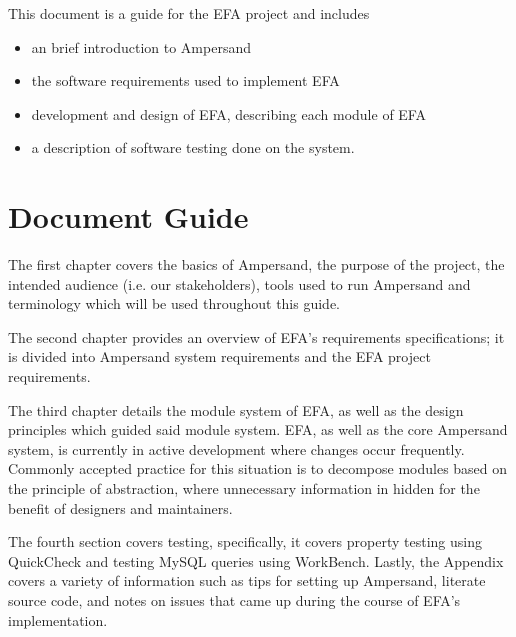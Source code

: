 \documentclass[journal,12pt,onecolumn,draftclsnofoot]{report}
\begin{document}
This document is a guide for the EFA project and includes 

\begin{itemize}
\item an brief introduction 
to Ampersand
\item the software requirements used to implement EFA
\item development and design of EFA, describing each module of EFA
\item a description of software testing done on the system.
\end{itemize}

\section{Document Guide}

The first chapter covers 
the basics of Ampersand, the purpose of the project, the intended audience 
(i.e. our stakeholders), tools used to run Ampersand and terminology which will 
be used throughout this guide. 

The second chapter provides an overview of EFA's requirements specifications; 
it is divided into Ampersand system requirements and the EFA project 
requirements.

The third chapter details the module system of EFA, as well as the design principles
which guided said module system. EFA, as well as the core Ampersand system, is
currently in active development where changes occur frequently. Commonly
accepted practice for this situation is to decompose modules based on the
principle of abstraction, where unnecessary information in hidden for the
benefit of designers and maintainers\citep{modStruct,Parnas1972}.

The fourth section covers testing, specifically, it covers property testing 
using QuickCheck and testing MySQL queries using WorkBench.
Lastly, the Appendix 
covers a variety of information such as tips for setting up 
Ampersand, literate source code, and notes on issues that came up during the 
course of EFA's 
implementation. 
\end{document}
